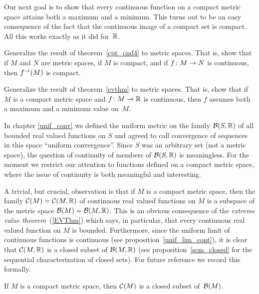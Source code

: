 Our next goal is to show that every continuous function on a compact metric space attains both
a maximum and a minimum.  This turns out to be an easy consequence of the fact that the
continuous image of a compact set is compact. All this works exactly as it did for~$\mathbb{R}$.

\begin{prob} Generalize the result of theorem~\ref{cpt_cnd4} to metric spaces.  That is, show
that if $M$ and $N$ are metric spaces, if $M$ is compact, and if $f \colon M \rightarrow N$ is
continuous, then $f^{\rightarrow}(M)$ is compact.
\end{prob}

%
\begin{prob}\label{EVThm}  Generalize the result of theorem~\ref{evthm}
to metric spaces.  That is, show that if $M$ is a compact metric space and $f \colon M \rightarrow
\mathbb{R}$ is continuous, then $f$ assumes both a maximum and a minimum value on~$M$.
\end{prob}

In chapter \ref{unif_conv} we defined the uniform metric on the family $\mathcal{B}(S,\mathbb{R})$ of all
bounded real valued functions on $S$ and agreed to call convergence of sequences in this space
``uniform convergence''.  Since $S$ was an arbitrary set (not a metric space), the question of
continuity of members of $\mathcal{B}(S,\mathbb{R})$ is meaningless.  For the moment we restrict our
attention to functions defined on a compact metric space, where the issue of continuity is
both meaningful and interesting.

A trivial, but crucial, observation is that if $M$ is a compact metric space, then the
family
$\mathcal{C}(M) = \mathcal{C}(M,\mathbb{R})$ of continuous real valued functions on $M$ is a subspace of
the metric space $\mathcal{B}(M) = \mathcal{B}(M,\mathbb{R})$.  This is an obvious consequence of the
\emph{extreme value theorem}~(\ref{EVThm}) which says, in particular, that every
continuous real valued function on $M$ is bounded.   Furthermore, since the uniform limit
of continuous functions is continuous (see proposition~\ref{unif_lim_cont}), it is clear
that $\mathcal{C}(M,\mathbb{R})$ is a closed subset of $\mathcal{B}(M,\mathbb{R})$ (see
proposition~\ref{scm_closed} for the sequential characterization of closed sets).  For
future reference we record this formally.

\begin{prop} If $M$ is a compact metric space, then $\mathcal{C}(M)$ is a closed subset
of~$\mathcal{B}(M)$.
\end{prop}

